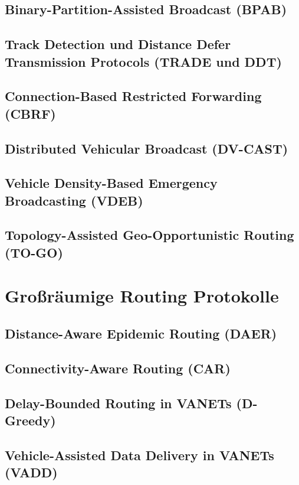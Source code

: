 \documentclass[english,runningheads,a4paper]{llncs}[2018/03/10]
\begin{document}
\subsection{Binary-Partition-Assisted Broadcast (BPAB)}

\subsection{Track Detection und Distance Defer Transmission Protocols (TRADE und DDT)}

\subsection{Connection-Based Restricted Forwarding (CBRF)}

\subsection{Distributed Vehicular Broadcast (DV-CAST)}

\subsection{Vehicle Density-Based Emergency Broadcasting (VDEB)}

\subsection{Topology-Assisted Geo-Opportunistic Routing (TO-GO)}

\section{Großräumige Routing Protokolle}
\label{sec:largescaleprotocols}

\subsection{Distance-Aware Epidemic Routing (DAER)}
\subsection{Connectivity-Aware Routing (CAR)}

\subsection{Delay-Bounded Routing in VANETs (D-Greedy)}
\subsection{Vehicle-Assisted Data Delivery in VANETs (VADD)}
\end{document}
